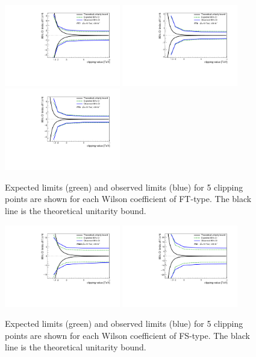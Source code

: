 \begin{figure}[ht]
   \includegraphics[width=0.45\textwidth]{figures/aQGC/FT7limit.pdf}
   \includegraphics[width=0.45\textwidth]{figures/aQGC/FT8limit.pdf}
   \includegraphics[width=0.45\textwidth]{figures/aQGC/FT9limit.pdf}
   \caption{Expected limits (green) and observed limits (blue) for 5 clipping points are shown for each Wilson coefficient of FT-type. 
   The black line is the theoretical unitarity bound.}
        \label{fig:aQGClimitsFTs}
\end{figure}
\begin{figure}[ht]
   \centering
   \includegraphics[width=0.45\textwidth]{figures/aQGC/FS02limit.pdf}
   \includegraphics[width=0.45\textwidth]{figures/aQGC/FS1limit.pdf}
   \caption{Expected limits (green) and observed limits (blue) for 5 clipping points are shown for each Wilson coefficient of FS-type. 
   The black line is the theoretical unitarity bound.}
        \label{fig:aQGClimitsFSs}
\end{figure}
